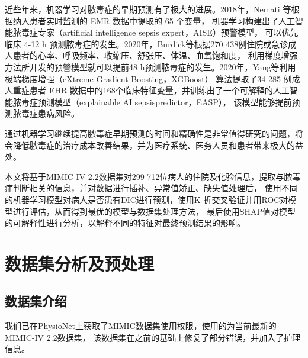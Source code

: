 \documentclass[12pt, a4paper, oneside]{ctexart}
\numberwithin{equation}{section}  %
\begin{document}
近些年来，机器学习对脓毒症的早期预测有了极大的进展。2018年，Nemati 等根据纳入患者实时监测的 EMR 数据中提取的 65 个变量，
机器学习构建出了人工智能脓毒症专家（artificial intelligence sepsis expert，AISE）预警模型，
可以优先临床 4-12 h 预测脓毒症的发生。2020年，Burdick等根据270 438例住院或急诊成人患者的心率、呼吸频率、收缩压、舒张压、体温、血氧饱和度，
利用梯度增强方法所开发的预警模型就可以提前48 h预测脓毒症的发生。2020年，Yang等利用极端梯度增强（eXtreme Gradient Boosting，XGBoost）
算法提取了34 285 例成人重症患者 EHR 数据中的168个临床特征变量，并训练出了一个可解释的人工智 能脓毒症预测模型（explainable AI sepsispredictor，EASP），
该模型能够提前预测脓毒症患病风险。

通过机器学习继续提高脓毒症早期预测的时间和精确性是非常值得研究的问题，将会降低脓毒症的治疗成本改善结果，并为医疗系统、医务人员和患者带来极大的益处。

本文将基于MIMIC-IV 2.2数据集对299 712位病人的住院及化验信息，提取与脓毒症判断相关的信息，并对数据进行插补、异常值矫正、缺失值处理后，
使用不同的机器学习模型对病人是否患有DIC进行预测，使用K-折交叉验证并用ROC对模型进行评估，从而得到最优的模型与数据集处理方法，
最后使用SHAP值对模型的可解释性进行分析，以解释不同的特征对最终预测结果的影响。
\clearpage
\section{数据集分析及预处理}
\subsection{数据集介绍}
我们已在PhysioNet上获取了MIMIC数据集使用权限，使用的为当前最新的MIMIC-IV 2.2数据集\cite{bib-mimic,bib-mimic-origin}，
该数据集在之前的基础上修复了部分错误，并加入了护理信息。
\end{document}
